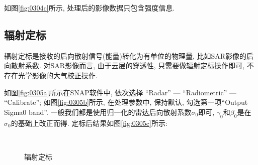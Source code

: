 如图\ref{fig:0304c}所示, 处理后的影像数据只包含强度信息. 

\subsection{辐射定标}
辐射定标是接收的后向散射信号(能量)转化为有单位的物理量, 比如SAR影像的后向散射系数. 对SAR影像而言, 由于云层的穿透性, 只需要做辐射定标操作即可, 不存在光学影像的大气校正操作. 

如图\ref{fig:0305a}所示在SNAP软件中, 依次选择 ``Radar'' --- ``Radiometric'' --- ``Calibrate''; 如图\ref{fig:0305b}所示, 在处理参数中, 保持默认, 勾选第一项``Output Sigma0 band''. 一般我们都是使用归一化的雷达后向散射系数$\sigma_{0}$即可, $\gamma_{0}$和$\beta_{0}$是在$\sigma_{0}$的基础上改正而得. 定标后结果如图\ref{fig:0305c}所示:

\begin{figure}[ht]
    \centering
    \qquad
    \\[12pt]
    \caption{辐射定标}
    \label{fig:0305}
\end{figure}

